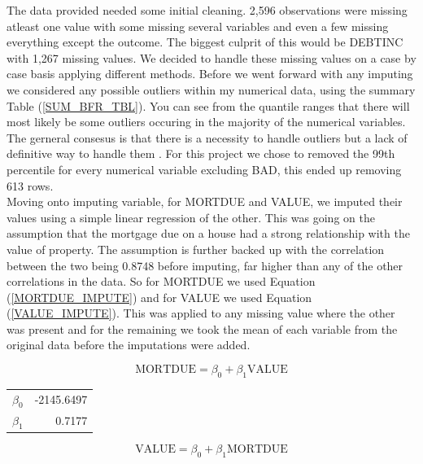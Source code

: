 The data provided needed some initial cleaning. 2,596 observations were missing atleast one value with some missing several variables and even a few missing everything except the outcome. The biggest culprit of this would be DEBTINC with 1,267 missing values. We decided to handle these missing values on a case by case basis applying different methods. Before we went forward with any imputing we considered any possible outliers within my numerical data, using the summary Table (\ref{SUM_BFR_TBL}). You can see from the quantile ranges that there will most likely be some outliers occuring in the majority of the numerical variables. The gerneral consesus is that there is a necessity to handle outliers but a lack of definitive way to handle them \parencite{nyitrai2019effects}. For this project we chose to removed the 99th percentile for every numerical variable excluding BAD, this ended up removing 613 rows. \\

Moving onto imputing variable, for MORTDUE and VALUE, we imputed their values using a simple linear regression of the other. This was going on the assumption that the mortgage due on a house had a strong relationship with the value of property. The assumption is further backed up with the correlation between the two being 0.8748 before imputing, far higher than any of the other correlations in the data. So for MORTDUE we used Equation (\ref{MORTDUE_IMPUTE}) and for VALUE we used Equation (\ref{VALUE_IMPUTE}). This was applied to any missing value where the other was present and for the remaining we took the mean of each variable from the original data before the imputations were added.

\begin{equation}\label{MORTDUE_IMPUTE}
\text{MORTDUE} = \beta_{0} + \beta_{1}\text{VALUE}
\end{equation}

\begin{table}[ht]\label{MORTDUE_IMPUTE_COEFS}
	\centering
	\begin{tabular}{lr}
	\hline
	$\beta_{0}$ & -2145.6497 \\
	$\beta_{1}$ & 0.7177 \\
	\hline
	\end{tabular}
\end{table}

\begin{equation}\label{VALUE_IMPUTE}
\text{VALUE} = \beta_{0} + \beta_{1}\text{MORTDUE}
\end{equation}

